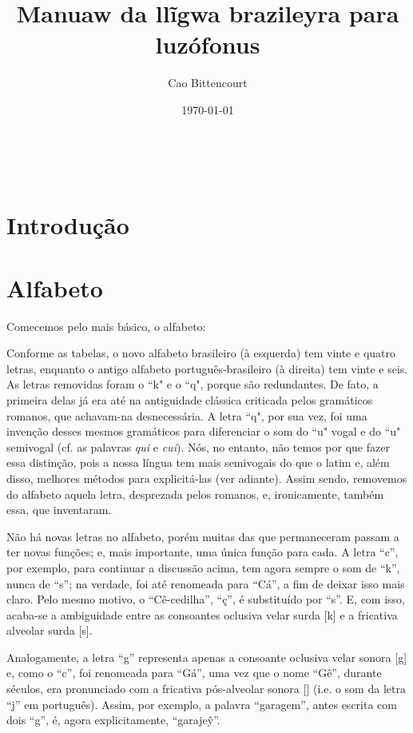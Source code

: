 \documentclass[12pt, a4paper]{article}
\title{Manuaw da llĩgwa brazileyra para luzófonus}
\author{Cao Bittencourt}
\date{\today}
\begin{document}
\maketitle
\thispagestyle{empty}

\newpage \
\thispagestyle{empty}

\newpage
\begin{bilingualpages}
    \rightpage
    \section{Introdução}
    
    \newpage
    \section{Alfabeto}
    Comecemos pelo mais básico, o alfabeto:
    
    \PtTableAbc
    
    Conforme as tabelas, o novo alfabeto brasileiro (à esquerda) tem vinte e quatro letras, enquanto o antigo alfabeto português-brasileiro (à direita) tem vinte e seis. As letras removidas foram o ``k" e o ``q", porque são redundantes. De fato, a primeira delas já era até na antiguidade clássica criticada pelos gramáticos romanos, que achavam-na desnecessária. A letra ``q", por sua vez, foi uma invenção desses mesmos gramáticos para diferenciar o som do ``u" vogal e do ``u" semivogal (cf. as palavras \textit{qui} e \textit{cui}). Nós, no entanto, não temos por que fazer essa distinção, pois a nossa língua tem mais semivogais do que o latim e, além disso, melhores métodos para explicitá-las (ver adiante). Assim sendo, removemos do alfabeto aquela letra, desprezada pelos romanos, e, ironicamente, também essa, que inventaram.

    Não há novas letras no alfabeto, porém muitas das que permaneceram passam a ter novas funções; e, mais importante, uma única função para cada. A letra ``c'', por exemplo, para continuar a discussão acima, tem agora sempre o som de ``k'', nunca de ``s''; na verdade, foi até renomeada para ``Cá'', a fim de deixar isso mais claro. Pelo mesmo motivo, o ``Cê-cedilha'', ``ç'', é substituído por ``s''. E, com isso, acaba-se a ambiguidade entre as consoantes oclusiva velar surda [k] e a fricativa alveolar surda [s].

    Analogamente, a letra ``g'' representa apenas a consoante oclusiva velar sonora [g] e, como o ``c'', foi renomeada para ``Gá'', uma vez que o nome ``Gê'', durante séculos, era pronunciado com a fricativa pós-alveolar sonora [\textyogh] (i.e. o som da letra ``j'' em português). Assim, por exemplo, a palavra ``garagem'', antes escrita com dois ``g'', é, agora explicitamente, ``garaje\~y''.


\end{bilingualpages}
\end{document}
